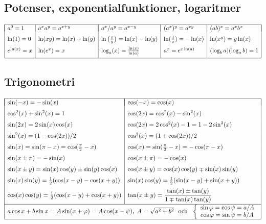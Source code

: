 \documentclass{article}
\begin{document}
\subsection*{Potenser, exponentialfunktioner, logaritmer}%


$\begin{array}{|l|l|l|l|l|}\hline
  &&&&\\*[-11pt]
  a^0=1 &a^xa^y=a^{x+y} &
  a^x/a^y=a^{x-y}&(a^x)^y=a^{xy} 
  & (ab)^x=a^xb^x 
\EndRow
  \ln(1)=0 &\ln(xy)=\ln(x)+\ln(y) &\ln\big(\frac{x}{y}\big)
  =\ln(x)-\ln(y) & 
  \ln(\frac1x) = -\ln(x) &
  \ln(x^y)=y\ln(x) 
\EndRow 
  e^{\ln(x)}=x & \ln(e^x)=x & \log_a(x)
  =\frac{\ln(x)}{\ln(a)} & a^x=e^{x\ln(a)} & 
  (\log_ba)(\log_ab) = 1
\EndRow
\hline\end{array}$%

\subsection*{Trigonometri}%
$\begin{array}{|l|l|}\hline &\\*[-11pt] %
 \sin(-x)=-\sin(x) &\cos(-x)=\cos(x) \EndRow
 \cos^2(x)+\sin^2(x)=1  &
 \cos(2x)=\cos^2(x)-\sin^2(x) \EndRow %
 \sin(2x)=2\sin(x)\cos(x)&\cos(2x)=2\cos^2(x)-1=1-2\sin^2(x) \EndRow
 \sin^2(x) = (1-\cos(2x))/2 &
 \cos^2(x) = (1+\cos(2x))/2 \EndRow %
 \sin(x)=\sin(\pi-x)=\cos(\frac{\pi}{2}-x) &
 \cos(x)=\sin(\frac{\pi}{2}-x)=-\cos(\pi-x)\EndRow 
 \sin(x\pm\pi) = -\sin(x) &
 \cos(x\pm\pi) = -\cos(x) \EndRow %
 \sin(x\pm y)=\sin(x)\cos(y)\pm\sin(y)\cos(x) &
 \cos(x\pm y)=\cos(x)\cos(y)\mp\sin(x)\sin(y)\EndRow 
 \sin(x)\sin(y)=\frac{1}{2}(\cos(x-y)-\cos(x+y)) &
 \sin(x)\cos(y)=\frac{1}{2}(\sin(x-y)+\sin(x+y)) \EndRow
 \cos(x)\cos(y)=\frac{1}{2}(\cos(x-y)+\cos(x+y)) &
 \tan(x\pm y)=\dfrac{\tan(x)\pm\tan(y)}{1\mp\tan(x)\tan(y)}\\*[8pt]
 \cline{1-2}\multicolumn{2}{|c|}{     %
   a\cos x+b\sin x=A\sin(x+\varphi) = A\cos(x-\psi),\;
              A=\sqrt{a^2+b^2}  
     \mbox{ \ och \ }
              \left\{ \begin{array}{l}
              \sin\varphi=\cos\psi=a/A \\
              \cos\varphi=\sin\psi=b/A
\end{array}\right.}
 \EndRow\hline\end{array}$ 
\vspace{5 mm}
\end{document}
